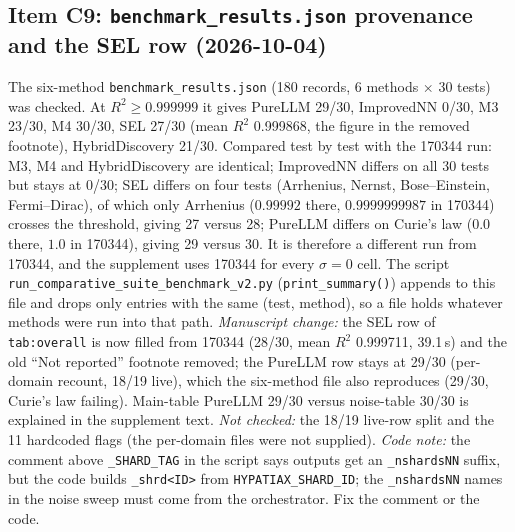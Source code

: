 \documentclass[11pt]{article}
\newcommand{\Rsq}{R^{2}}
\begin{document}
\subsection*{Item C9: \texttt{benchmark\_results.json} provenance and the SEL row (2026-10-04)}
The six-method \texttt{benchmark\_results.json} (180 records, 6 methods $\times$ 30 tests) was checked. At $\Rsq\ge0.999999$ it gives
PureLLM 29/30, ImprovedNN 0/30, M3 23/30, M4 30/30, SEL 27/30 (mean $\Rsq$ 0.999868, the figure in the removed footnote), HybridDiscovery
21/30. Compared test by test with the 170344 run: M3, M4 and HybridDiscovery are identical; ImprovedNN differs on all 30 tests but
stays at 0/30; SEL differs on four tests (Arrhenius, Nernst, Bose--Einstein, Fermi--Dirac), of which only Arrhenius ($0.99992$ there, $0.9999999987$ in 170344)
crosses the threshold, giving 27 versus 28; PureLLM differs on Curie's law ($0.0$ there, $1.0$ in 170344), giving 29 versus 30.
It is therefore a different run from 170344, and the supplement uses 170344 for every $\sigma=0$ cell. The script
\texttt{run\_comparative\_suite\_benchmark\_v2.py} (\texttt{print\_summary()}) appends to this file and drops only entries with the same (test, method), so
a file holds whatever methods were run into that path. \emph{Manuscript change:} the SEL row of \texttt{tab:overall} is now filled from 170344
(28/30, mean $\Rsq$ 0.999711, 39.1\,s) and the old ``Not reported'' footnote removed; the PureLLM row stays at 29/30 (per-domain recount, 18/19 live),
which the six-method file also reproduces (29/30, Curie's law failing). Main-table PureLLM 29/30 versus noise-table 30/30 is explained in the
supplement text. \emph{Not checked:} the 18/19 live-row split and the 11 hardcoded flags (the per-domain files were not supplied).
\emph{Code note:} the comment above \texttt{\_SHARD\_TAG} in the script says outputs get an \texttt{\_nshardsNN} suffix, but the code builds
\texttt{\_shrd<ID>} from \texttt{HYPATIAX\_SHARD\_ID}; the \texttt{\_nshardsNN} names in the noise sweep must come from the orchestrator.
Fix the comment or the code.
\end{document}
